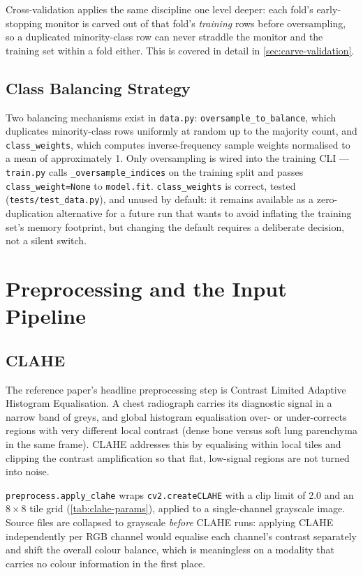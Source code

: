 \documentclass[11pt,a4paper,oneside]{report}
\newcommand{\code}[1]{\texttt{\small #1}}
\begin{document}
Cross-validation applies the same discipline one level deeper: each fold's
early-stopping monitor is carved out of that fold's \emph{training} rows
before oversampling, so a duplicated minority-class row can never straddle
the monitor and the training set within a fold either. This is covered in
detail in \cref{sec:carve-validation}.

\section{Class Balancing Strategy}

Two balancing mechanisms exist in \code{data.py}: \code{oversample\_to\_balance},
which duplicates minority-class rows uniformly at random up to the majority
count, and \code{class\_weights}, which computes inverse-frequency sample
weights normalised to a mean of approximately 1. Only oversampling is wired
into the training CLI --- \code{train.py} calls
\code{\_oversample\_indices} on the training split and passes
\code{class\_weight=None} to \code{model.fit}. \code{class\_weights} is
correct, tested (\texttt{tests/test\_data.py}), and unused by default: it
remains available as a zero-duplication alternative for a future run that
wants to avoid inflating the training set's memory footprint, but changing
the default requires a deliberate decision, not a silent switch.

\chapter{Preprocessing and the Input Pipeline}
\label{ch:preprocessing}

\section{CLAHE}

The reference paper's headline preprocessing step is Contrast Limited
Adaptive Histogram Equalisation. A chest radiograph carries its diagnostic
signal in a narrow band of greys, and global histogram equalisation over- or
under-corrects regions with very different local contrast (dense bone versus
soft lung parenchyma in the same frame). CLAHE addresses this by equalising
within local tiles and clipping the contrast amplification so that flat,
low-signal regions are not turned into noise.

\code{preprocess.apply\_clahe} wraps \code{cv2.createCLAHE} with a clip limit
of 2.0 and an $8\times 8$ tile grid (\cref{tab:clahe-params}), applied to a
single-channel grayscale image. Source files are collapsed to grayscale
\emph{before} CLAHE runs: applying CLAHE independently per RGB channel would
equalise each channel's contrast separately and shift the overall colour
balance, which is meaningless on a modality that carries no colour
information in the first place.
\end{document}
